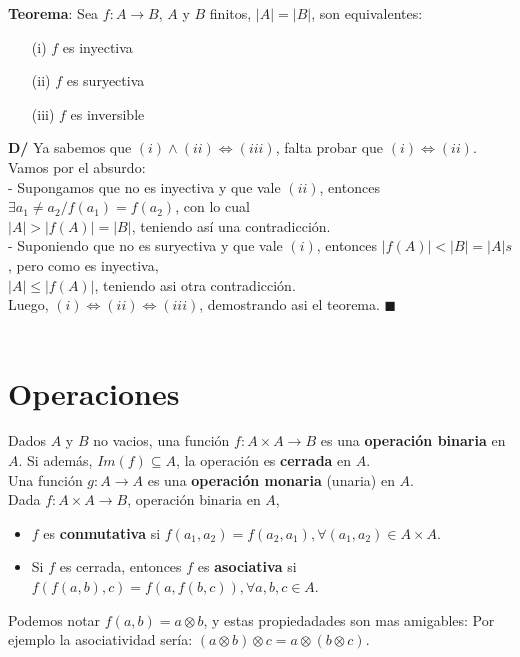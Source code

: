 \documentclass[11pt,a4paper]{article}
\newcommand*{\QEDA}{\null\nobreak\hfill\ensuremath{\blacksquare}}
\begin{document}
\noindent \textbf{Teorema}: Sea $f:A \rightarrow B$, $A$ y $B$ finitos, $|A| = |B|$, son equivalentes:
\begin{multicols}{3}
\begin{enumerate}
\item[(i)] $f$ es inyectiva
\item[(ii)] $f$ es suryectiva
\item[(iii)] $f$ es inversible
\end{enumerate}
\end{multicols}
\noindent \textbf{D/} Ya sabemos que $(i)\land(ii) \iff (iii)$, falta probar que $(i)\iff(ii)$. Vamos por el absurdo:\\
- Supongamos que no es inyectiva y que vale $(ii)$, entonces $\exists a_1 \not = a_2 / f(a_1) = f(a_2)$, con lo cual\\ \indent $|A|>|f(A)|=|B|$, teniendo as\'i una contradicci\'on.\\
- Suponiendo que no es suryectiva y que vale $(i)$, entonces $|f(A)| < |B| = |A|s$, pero como es inyectiva,\\ \indent $|A| \leq |f(A)|$, teniendo asi otra contradicci\'on. \\
Luego, $(i)\iff(ii)\iff(iii)$, demostrando asi el teorema. \QEDA \\ \\


\section{Operaciones}
\noindent Dados $A$ y $B$ no vacios, una funci\'on $f : A \times A \rightarrow B$ es una \textbf{operaci\'on binaria} en $A$. Si adem\'as, $Im(f) \subseteq A$, la operaci\'on es \textbf{cerrada} en $A$.\\
\noindent Una funci\'on $g : A \rightarrow A$ es una \textbf{operaci\'on monaria} (unaria) en $A$.\\


\noindent Dada $f: A \times A \rightarrow B$, operaci\'on binaria en $A$, 
\begin{itemize}
\item $f$ es \textbf{conmutativa} si $f(a_1, a_2) = f(a_2, a_1), \forall (a_1, a_2) \in A \times A$.
\item Si $f$ es cerrada, entonces $f$ es \textbf{asociativa} si $f(f(a,b), c) = f(a,f(b,c)), \forall a,b,c \in A$.
\end{itemize}
\noindent Podemos notar $f(a,b) = a \otimes b$, y estas propiedadades son mas amigables: Por ejemplo la asociatividad ser\'ia: $(a \otimes b) \otimes c = a \otimes (b \otimes c)$.\\
\end{document}
